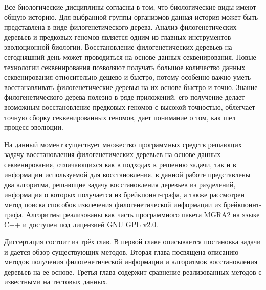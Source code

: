 \intro

Все биологические дисциплины согласны в том, что биологические виды имеют общую историю.
Для выбранной группы организмов данная история может быть представлена в виде филогенетического дерева.
Анализ филогенетических деревьев и предковых геномов является одним из главных инструментов эволюционной биологии.
Восстановление филогенетических деревьев на сегодняшний день может проводиться на основе данных секвенирования.
Новые технологии секвенирования позволяют получать большое количество данных секвенирования относительно дешево и быстро,
потому особенно важно уметь восстанавливать филогенетические деревья на их основе быстро и точно.
Знание филогенетического дерева полезно в ряде приложений, его получение делает возможным восстановление предковых геномов с высокой точностью,
облегчает точную сборку секвенированных геномов, дает понимание о том, как шел процесс эволюции.

На данный момент существует множество программных средств решающих задачу восстановления филогенетических деревьев на основе данных
секвенирования, отличающихся как в подходах к решению задачи, так и в информации используемой для восстановления,
в данной работе представлены два алгоритма, решающие задачу восстановления деревьев из разделений, информация о которых получается из брейкпоинт-графа,
а также рассмотрен метод поиска способов извлечения филогенетической информации из брейкпоинт-графа.
Алгоритмы реализованы как часть программного пакета MGRA2 на языке C++ и доступен под лицензией GNU GPL v2.0.

Диссертация состоит из трёх глав.
В первой главе описывается постановка задачи и дается обзор существующих методов.
Вторая глава посвящена описанию методов получения филогенетической информации и алгоритмов восстановления деревьев на ее основе.
Третья глава содержит сравнение реализованных методов с известными на тестовых данных.

